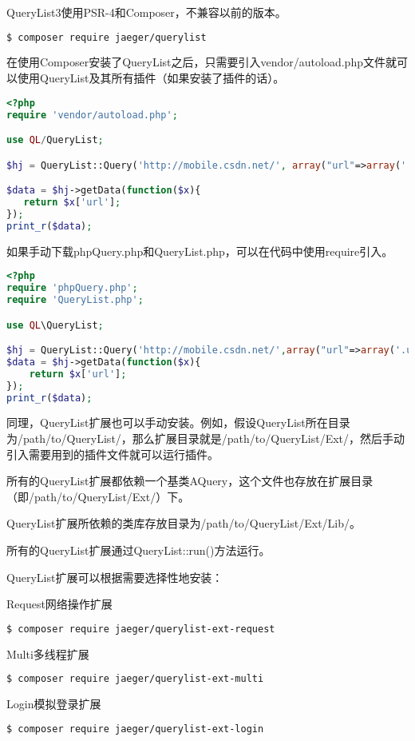 QueryList3使用PSR-4和Composer，不兼容以前的版本。

\begin{lstlisting}[language=bash]
$ composer require jaeger/querylist
\end{lstlisting}

在使用Composer安装了QueryList之后，只需要引入vendor/autoload.php文件就可以使用QueryList及其所有插件（如果安装了插件的话）。




\begin{lstlisting}[language=PHP]
<?php
require 'vendor/autoload.php';

use QL/QueryList;

$hj = QueryList::Query('http://mobile.csdn.net/', array("url"=>array('.unit h1 a', 'href')));

$data = $hj->getData(function($x){
   return $x['url'];
});
print_r($data);
\end{lstlisting}

如果手动下载phpQuery.php和QueryList.php，可以在代码中使用require引入。


\begin{lstlisting}[language=PHP]
<?php
require 'phpQuery.php';
require 'QueryList.php';

use QL\QueryList;

$hj = QueryList::Query('http://mobile.csdn.net/',array("url"=>array('.unit h1 a','href')));
$data = $hj->getData(function($x){
    return $x['url'];
});
print_r($data);
\end{lstlisting}


同理，QueryList扩展也可以手动安装。例如，假设QueryList所在目录为/path/to/QueryList/，那么扩展目录就是/path/to/QueryList/Ext/，然后手动引入需要用到的插件文件就可以运行插件。

所有的QueryList扩展都依赖一个基类AQuery，这个文件也存放在扩展目录（即/path/to/QueryList/Ext/）下。

QueryList扩展所依赖的类库存放目录为/path/to/QueryList/Ext/Lib/。

所有的QueryList扩展通过QueryList::run()方法运行。

QueryList扩展可以根据需要选择性地安装：


\begin{compactitem}
\item Request网络操作扩展

\begin{lstlisting}[language=bash]
$ composer require jaeger/querylist-ext-request
\end{lstlisting}

\item Multi多线程扩展

\begin{lstlisting}[language=bash]
$ composer require jaeger/querylist-ext-multi
\end{lstlisting}

\item Login模拟登录扩展

\begin{lstlisting}[language=bash]
$ composer require jaeger/querylist-ext-login
\end{lstlisting}
\end{compactitem}

